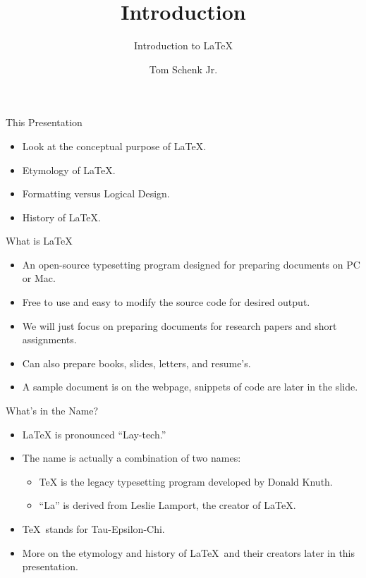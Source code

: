\documentclass[pdf]{prosper}
\title{Introduction}
\subtitle{Introduction to \LaTeX}
\author{Tom Schenk Jr.}
\begin{document}
\maketitle
\begin{slide}{This Presentation}
	\begin{itemize}
		\item Look at the conceptual purpose of \LaTeX.
		\item Etymology of \LaTeX.
		\item Formatting versus Logical Design.
		\item History of \LaTeX.
	\end{itemize}
\end{slide}
\begin{slide}{What is \LaTeX\?}
	\begin{itemize}
		\item An open-source typesetting program designed for preparing documents on PC or Mac.
		\item Free to use and easy to modify the source code for desired output.
		\item We will just focus on preparing documents for research papers and short assignments.
		\item Can also prepare books, slides, letters, and resume's.
		\item A sample document is on the webpage, snippets of code are later in the slide.
	\end{itemize}
\end{slide}
\begin{slide}{What's in the Name?}
	\begin{itemize}
		\item \LaTeX\mbox{} is pronounced ``Lay-tech.''
		\item The name is actually a combination of two names:
			\begin{itemize}
				\item \TeX\mbox{} is the legacy typesetting program developed by Donald Knuth.
				\item ``La'' is derived from Leslie Lamport, the creator of \LaTeX.
			\end{itemize}
		\item \TeX\ stands for Tau-Epsilon-Chi.
		\item More on the etymology and history of \LaTeX\ and their creators later in this presentation.
	\end{itemize}
\end{slide}
\end{document}
